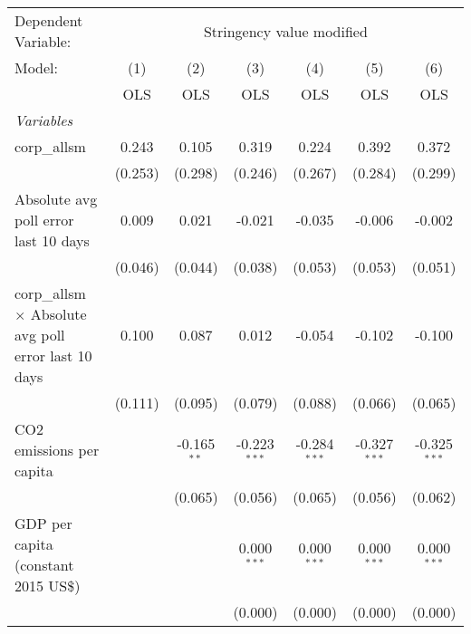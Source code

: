 
\begingroup
\centering
\begin{tabular}{lcccccc}
   \toprule
   Dependent Variable: & \multicolumn{6}{c}{Stringency value modified}\\
   Model:                                                      & (1)     & (2)           & (3)            & (4)            & (5)            & (6)\\  
                                                               &  OLS    & OLS           & OLS            & OLS            & OLS            & OLS\\  
   \midrule
   \emph{Variables}\\
   corp\_allsm                                                 & 0.243   & 0.105         & 0.319          & 0.224          & 0.392          & 0.372\\   
                                                               & (0.253) & (0.298)       & (0.246)        & (0.267)        & (0.284)        & (0.299)\\   
   Absolute avg poll error last 10 days                        & 0.009   & 0.021         & -0.021         & -0.035         & -0.006         & -0.002\\   
                                                               & (0.046) & (0.044)       & (0.038)        & (0.053)        & (0.053)        & (0.051)\\   
   corp\_allsm $\times$ Absolute avg poll error last 10 days   & 0.100   & 0.087         & 0.012          & -0.054         & -0.102         & -0.100\\   
                                                               & (0.111) & (0.095)       & (0.079)        & (0.088)        & (0.066)        & (0.065)\\   
   CO2 emissions per capita                                    &         & -0.165$^{**}$ & -0.223$^{***}$ & -0.284$^{***}$ & -0.327$^{***}$ & -0.325$^{***}$\\   
                                                               &         & (0.065)       & (0.056)        & (0.065)        & (0.056)        & (0.062)\\   
   GDP per capita (constant 2015 US\$)                         &         &               & 0.000$^{***}$  & 0.000$^{***}$  & 0.000$^{***}$  & 0.000$^{***}$\\   
                                                               &         &               & (0.000)        & (0.000)        & (0.000)        & (0.000)\\   

\end{tabular}

